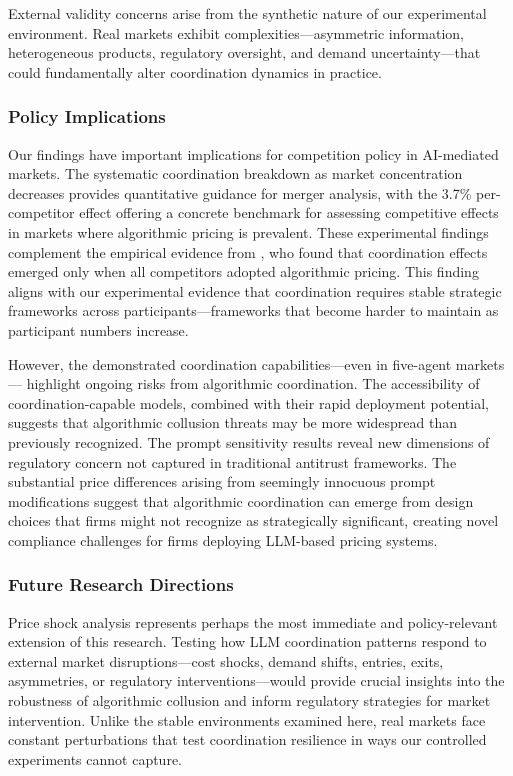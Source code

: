 External validity concerns arise from the synthetic nature of our experimental environment. Real markets exhibit complexities—asymmetric information, heterogeneous products, regulatory oversight, and demand uncertainty---that could fundamentally alter coordination dynamics in practice.

\subsubsection*{Policy Implications}

Our findings have important implications for competition policy in AI-mediated markets. The systematic coordination breakdown as market concentration decreases provides quantitative guidance for merger analysis, with the 3.7\% per-competitor effect offering a concrete benchmark for assessing competitive effects in markets where algorithmic pricing is prevalent. These experimental findings complement the empirical evidence from \textcite{assad_algorithmic_2024}, who found that coordination effects emerged only when all competitors adopted algorithmic pricing. This finding aligns with our experimental evidence that coordination requires stable strategic frameworks across participants—frameworks that become harder to maintain as participant numbers increase.

However, the demonstrated coordination capabilities---even in five-agent markets— highlight ongoing risks from algorithmic coordination. The accessibility of coordination-capable models, combined with their rapid deployment potential, suggests that algorithmic collusion threats may be more widespread than previously recognized. The prompt sensitivity results reveal new dimensions of regulatory concern not captured in traditional antitrust frameworks. The substantial price differences arising from seemingly innocuous prompt modifications suggest that algorithmic coordination can emerge from design choices that firms might not recognize as strategically significant, creating novel compliance challenges for firms deploying LLM-based pricing systems.

\subsubsection*{Future Research Directions}

Price shock analysis represents perhaps the most immediate and policy-relevant extension of this research. Testing how LLM coordination patterns respond to external market disruptions---cost shocks, demand shifts, entries, exits, asymmetries, or regulatory interventions---would provide crucial insights into the robustness of algorithmic collusion and inform regulatory strategies for market intervention. Unlike the stable environments examined here, real markets face constant perturbations that test coordination resilience in ways our controlled experiments cannot capture.

